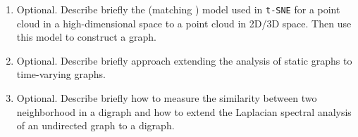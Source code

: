 \begin{enumerate}
 \item {\rm Optional.} Describe briefly the (matching ) model used in
   \texttt{t-SNE} for a point cloud in a high-dimensional space to a
   point cloud in 2D/3D space. Then use this model to construct a
   graph.

 \item {\rm Optional.} Describe briefly approach extending the analysis
   of static graphs to time-varying graphs.
   
 \item {\rm Optional.} Describe briefly how to measure the similarity
   between two neighborhood in a digraph and how to extend the
   Laplacian spectral analysis of an undirected graph to a digraph.

\end{enumerate} 


